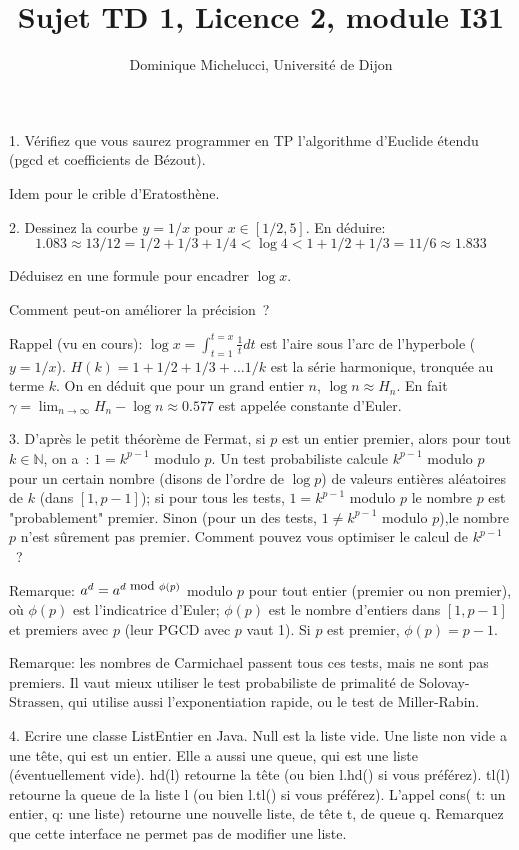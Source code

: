 \documentclass[a4paper]{article}
\def\N{\mathbb{N}}
\begin{document}
\title{Sujet TD  1, Licence 2, module I31} 
\author{Dominique Michelucci, Universit\'e de Dijon}
\maketitle

1. V\'erifiez que vous saurez programmer en TP l'algorithme d'Euclide \'etendu (pgcd et coefficients de B\'ezout).

Idem pour le crible d'Eratosth\`ene.

2. Dessinez la courbe $y=1/x$ pour $x\in [1/2, 5]$.
En d\'eduire:
$$ 1.083 \approx 13/12 =1/2 + 1/3 + 1/4 < \log 4 < 1 + 1/2 + 1/3 = 11/6 \approx 1.833 $$ 

D\'eduisez en une formule pour encadrer $\log x$.

Comment peut-on am\'eliorer la pr\'ecision~?

Rappel (vu en cours): $\log x = \int_{t=1}^{t=x} \frac{1}{t} dt$ est l'aire sous l'arc de l'hyperbole ($y=1/x$). $H(k)=1 + 1/2 + 1/3 + \ldots 1/k$ est la s\'erie harmonique, tronqu\'ee au terme $k$.
On en d\'eduit que pour un grand entier $n$, $\log n\approx H_n$. En fait $\gamma=\lim_{n\rightarrow \infty} H_n - \log n\approx 0.577$ est appel\'ee constante d'Euler.


3. D'apr\`es le petit th\'eor\`eme de Fermat, si $p$ est un entier premier, alors pour tout $k\in \N$, on a~: $1=k^{p-1}$ modulo $p$. Un test probabiliste calcule $k^{p-1}$ modulo $ p$ pour 
un certain nombre (disons de l'ordre de $\log p$) de valeurs enti\`eres al\'eatoires 
de $k$ (dans $[1, p-1]$); si pour tous les tests,  $1= k^{p-1} $ modulo  $ p $
le nombre $p$ est "probablement" premier. Sinon (pour un des tests, $1 \neq k^{p-1}$ modulo $p$),le nombre $p$ n'est s\^urement pas premier.
Comment pouvez vous optimiser le calcul de $k^{p-1}$~?

Remarque: $a^d= a^{d {\small \mbox{ mod }} \phi(p)}$ modulo  $ p $ pour tout entier (premier ou non premier), o\`u $\phi(p)$ est l'indicatrice d'Euler;
$\phi(p)$ est le nombre d'entiers dans $[1,p-1]$ et premiers avec $p$ 
(leur PGCD avec $p$ vaut 1). Si $p$ est premier, $\phi(p)=p-1$.

Remarque: les nombres de Carmichael passent tous ces tests, mais ne sont
pas premiers.
Il vaut mieux utiliser le test probabiliste de primalit\'e de  Solovay-Strassen,
qui utilise aussi l'exponentiation rapide, ou le test de Miller-Rabin. 

4. Ecrire une classe ListEntier en Java. 
Null est la liste vide. Une liste non vide a une t\^ete, qui est un entier.
Elle a aussi une queue, qui est une liste (\'eventuellement vide).
hd(l) retourne la t\^ete (ou bien l.hd() si vous pr\'ef\'erez).
tl(l) retourne la queue de la liste l (ou bien l.tl() si vous pr\'ef\'erez).
L'appel cons( t: un entier, q: une liste) retourne une nouvelle liste, 
de t\^ete t, de queue q. Remarquez que cette interface ne permet pas de modifier une liste.
 
\end{document}
